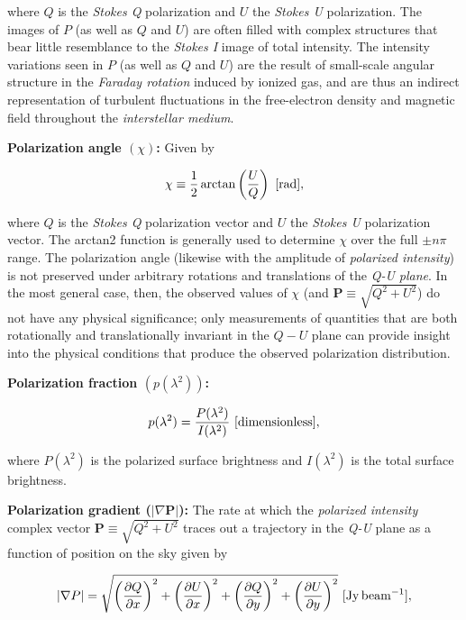 \documentclass[a4paper,11pt]{article}
\begin{document}
{\noindent}where $Q$ is the \textit{Stokes Q} polarization and $U$ the \textit{Stokes U} polarization. The images of $P$ (as well as $Q$ and $U$) are often filled with complex structures that bear little resemblance to the \textit{Stokes I} image of total intensity. The intensity variations seen in $P$ (as well as $Q$ and $U$) are the result of small-scale angular structure in the \textit{Faraday rotation} induced by ionized gas, and are thus an indirect representation of turbulent fluctuations in the free-electron density and magnetic field throughout the \textit{interstellar medium}.

{\noindent}\textbf{Polarization angle $(\chi)$:} Given by

\begin{align*}
    \chi\equiv\frac{1}{2}\arctan\left(\frac{U}{Q}\right) ~ [{\rm rad}],
\end{align*}

{\noindent}where $Q$ is the \textit{Stokes Q} polarization vector and $U$ the \textit{Stokes U} polarization vector. The arctan2 function is generally used to determine $\chi$ over the full $\pm n\pi$ range. The polarization angle (likewise with the amplitude of \textit{polarized intensity}) is not preserved under arbitrary rotations and translations of the \textit{Q-U plane}. In the most general case, then, the observed values of $\chi$ (and $\mathbf{P}\equiv\sqrt{Q^2+U^2}$) do not have any physical significance; only measurements of quantities that are both rotationally and translationally invariant in the $Q-U$ plane can provide insight into the physical conditions that produce the observed polarization distribution.

{\noindent}\textbf{Polarization fraction $(p(\lambda^2))$:}

\begin{align*}
    p(\lambda^2) = \frac{P(\lambda^2)}{I(\lambda^2)} ~ [{\rm dimensionless}],
\end{align*}

{\noindent}where $P(\lambda^2)$ is the polarized surface brightness and $I(\lambda^2)$ is the total surface brightness.

{\noindent}\textbf{Polarization gradient ($\lvert\nabla \mathbf{P}\rvert$):} The rate at which the \textit{polarized intensity} complex vector $\mathbf{P}\equiv\sqrt{Q^2+U^2}$ traces out a trajectory in the \textit{Q-U} plane as a function of position on the sky given by

\begin{align*}
    \lvert\nabla P\rvert = \sqrt{\left(\frac{\partial Q}{\partial x}\right)^2 + \left(\frac{\partial U}{\partial x}\right)^2 + \left(\frac{\partial Q}{\partial y}\right)^2 + \left(\frac{\partial U}{\partial y}\right)^2} ~ [{\rm Jy\,beam^{-1}}],
\end{align*}
\end{document}
